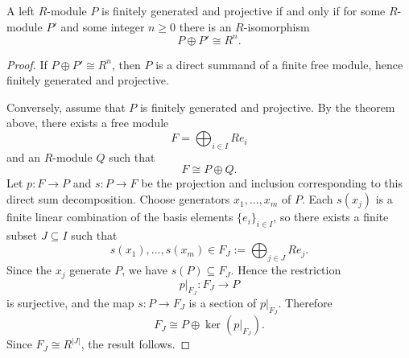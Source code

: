 \begin{corollary}
    A left $R$-module $P$ is finitely generated and projective if and only if for some $R$-module $P'$ and some integer $n\ge 0$ there is an $R$-isomorphism
    \[
        P\oplus P'\cong R^n.
    \]
\end{corollary}

\begin{proof}
    If $P\oplus P'\cong R^n$, then $P$ is a direct summand of a finite free module, hence
    finitely generated and projective.

    Conversely, assume that $P$ is finitely generated and projective. By the theorem above,
    there exists a free module
    \[
        F=\bigoplus_{i\in I} Re_i
    \]
    and an $R$-module $Q$ such that
    \[
        F\cong P\oplus Q.
    \]
    Let $p:F\to P$ and $s:P\to F$ be the projection and inclusion corresponding to this direct
    sum decomposition. Choose generators $x_1,\dots,x_m$ of $P$. Each $s(x_j)$ is a finite
    linear combination of the basis elements $\{e_i\}_{i\in I}$, so there exists a finite
    subset $J\subseteq I$ such that
    \[
        s(x_1),\dots,s(x_m)\in F_J:=\bigoplus_{j\in J} Re_j.
    \]
    Since the $x_j$ generate $P$, we have $s(P)\subseteq F_J$. Hence the restriction
    \[
        p|_{F_J}:F_J\to P
    \]
    is surjective, and the map $s:P\to F_J$ is a section of $p|_{F_J}$. Therefore
    \[
        F_J\cong P\oplus \ker(p|_{F_J}).
    \]
    Since $F_J\cong R^{|J|}$, the result follows.
\end{proof}

